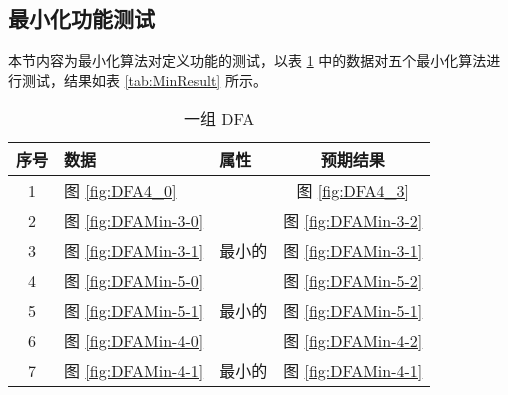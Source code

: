 \newpage
\subsection{最小化功能测试}

本节内容为最小化算法对定义功能的测试，以表 \ref{tab:MinData} 中的数据对五个最小化算法进行测试，结果如表 \ref{tab:MinResult} 所示。

\begin{table}[!htbp]
    \caption{一组 DFA}
    \label{tab:MinData}
    \centering
    \small%
    \setlength{\tabcolsep}{4pt}%
    \renewcommand{\arraystretch}{1.2}%
    \begin{tabular}{c p{4em}<{\centering} p{4em}<{\centering} c }  %
        \toprule %
                序号  &  数据 & 属性 & 预期结果  \\
        \midrule%
        1 &  图 \ref{fig:DFA4_0} &            & 图 \ref{fig:DFA4_3}\\
        \midrule
        2 & 图 \ref{fig:DFAMin-3-0} &         & 图 \ref{fig:DFAMin-3-2}  \\
        3 & 图 \ref{fig:DFAMin-3-1} & 最小的  & 图 \ref{fig:DFAMin-3-1}  \\
        \midrule
        4 & 图 \ref{fig:DFAMin-5-0} &         & 图 \ref{fig:DFAMin-5-2}  \\
        5 & 图 \ref{fig:DFAMin-5-1} & 最小的  & 图 \ref{fig:DFAMin-5-1}  \\
        \midrule
        6 & 图 \ref{fig:DFAMin-4-0} &        & 图 \ref{fig:DFAMin-4-2}  \\
        7 & 图 \ref{fig:DFAMin-4-1} & 最小的  & 图 \ref{fig:DFAMin-4-1}  \\
        \bottomrule%
    \end{tabular}
\end{table}

